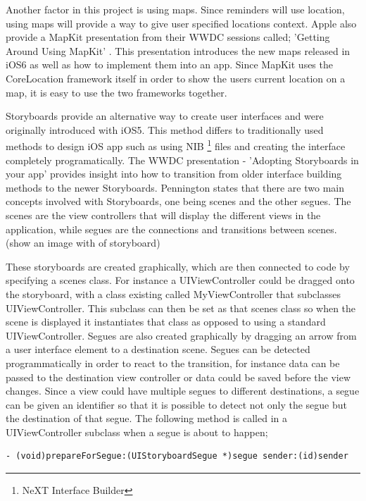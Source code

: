\documentclass[12pt]{report}
\begin{document}
Another factor in this project is using maps. Since reminders will use location, using maps will provide a way to give user specified locations context. Apple also provide a MapKit presentation from their WWDC sessions called; 'Getting Around Using MapKit' \cite{mapkit}. This presentation introduces the new maps released in iOS6 as well as how to implement them into an app. Since MapKit uses the CoreLocation framework itself in order to show the users current location on a map, it is easy  to use the two frameworks together.

Storyboards provide an alternative way to create user interfaces and were originally introduced with iOS5. This method differs to traditionally used methods to design iOS app such as using NIB \footnote{NeXT Interface Builder} files and creating the interface completely programatically. The WWDC presentation - 'Adopting Storyboards in your app' \cite{storyboards} provides insight into how to transition from older interface building methods to the newer Storyboards. Pennington states that there are two main concepts involved with Storyboards, one being scenes and the other segues. The scenes are the view controllers that will display the different views in the application, while segues are the connections and transitions between scenes. (show an image with of storyboard)

These storyboards are created graphically, which are then connected to code by specifying a scenes class. For instance a UIViewController could be dragged onto the storyboard, with a class existing called MyViewController that subclasses UIViewController. This subclass can then be set as that scenes class so when the scene is displayed it instantiates that class as opposed to using a standard UIViewController. Segues are also created graphically by dragging an arrow from a user interface element to a destination scene. Segues can be detected programmatically in order to react to the transition, for instance data can be passed to the destination view controller or data could be saved before the view changes. Since a view could have multiple segues to different destinations, a segue can be given an identifier so that it is possible to detect not only the segue but the destination of that segue. The following method is called in a UIViewController subclass when a segue is about to happen;

\begin{verbatim}
- (void)prepareForSegue:(UIStoryboardSegue *)segue sender:(id)sender
\end{verbatim}
\end{document}
